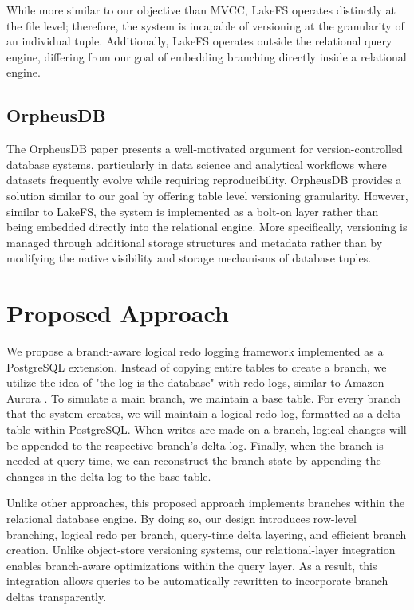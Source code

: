 \documentclass[sigplan, nonacm]{acmart}
\begin{document}
While more similar to our objective than MVCC, LakeFS operates distinctly at the file level; therefore, the system is incapable of versioning at the granularity of an individual tuple. Additionally, LakeFS operates outside the relational query engine, differing from our goal of embedding branching directly inside a relational engine.

\subsection{OrpheusDB}
The OrpheusDB paper \cite{orpheusdb} presents a well-motivated argument for version-controlled database systems, particularly in data science and analytical workflows where datasets frequently evolve while requiring reproducibility. OrpheusDB provides a solution similar to our goal by offering table level versioning granularity. However, similar to LakeFS, the system is implemented as a bolt-on layer rather than being embedded directly into the relational engine. More specifically, versioning is managed through additional storage structures and metadata rather than by modifying the native visibility and storage mechanisms of database tuples.


\section{Proposed Approach}
We propose a branch-aware logical redo logging framework implemented as a PostgreSQL extension. Instead of copying entire tables to create a branch, we utilize the idea of "the log is the database" with redo logs, similar to Amazon Aurora \cite{aurora}. To simulate a main branch, we maintain a base table. For every branch that the system creates, we will maintain a logical redo log, formatted as a delta table within PostgreSQL. When writes are made on a branch, logical changes will be appended to the respective branch's delta log. Finally, when the branch is needed at query time, we can reconstruct the branch state by appending the changes in the delta log to the base table.

Unlike other approaches, this proposed approach implements branches within the relational database engine. By doing so, our design introduces row-level branching, logical redo per branch, query-time delta layering, and efficient branch creation. Unlike object-store versioning systems, our relational-layer integration enables branch-aware optimizations within the query layer. As a result, this integration allows queries to be automatically rewritten to incorporate branch deltas transparently.
\end{document}
